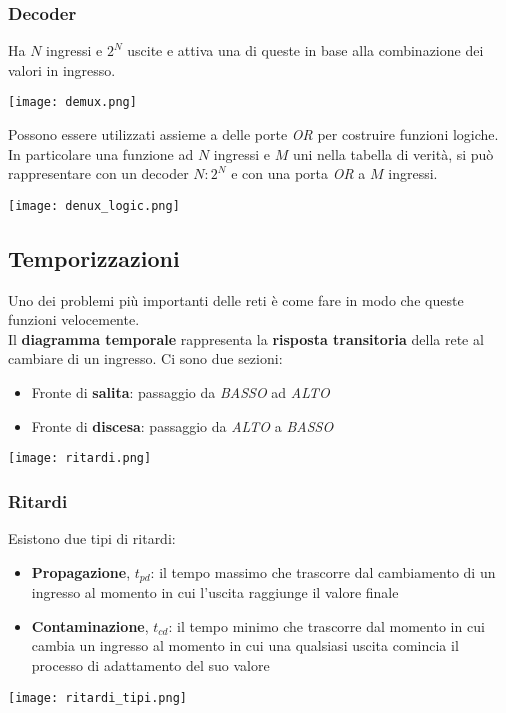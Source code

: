 \subsubsection{Decoder}
Ha $N$ ingressi e $2^N$ uscite e attiva una di queste in base alla combinazione dei valori in ingresso.
\begin{center}
	\texttt{[image: demux.png]}
\end{center}
Possono essere utilizzati assieme a delle porte \textit{OR} per costruire funzioni logiche. In particolare una funzione ad $N$ ingressi e $M$ uni nella tabella di verità, si può rappresentare con un decoder $N:2^N$ e con una porta \textit{OR} a $M$ ingressi.
\begin{center}
	\texttt{[image: denux\_logic.png]}
\end{center}

\subsection{Temporizzazioni}
Uno dei problemi più importanti delle reti è come fare in modo che queste funzioni velocemente.\\
Il \textbf{diagramma temporale} rappresenta la \textbf{risposta transitoria} della rete al cambiare di un ingresso. Ci sono due sezioni:
\begin{itemize}
	\item Fronte di \textbf{salita}: passaggio da \textit{BASSO} ad \textit{ALTO}
	\item Fronte di \textbf{discesa}: passaggio da \textit{ALTO} a \textit{BASSO}
\end{itemize}
\begin{center}
	\texttt{[image: ritardi.png]}
\end{center}
\subsubsection{Ritardi}
Esistono due tipi di ritardi:
\begin{itemize}
	\item \textbf{Propagazione}, $t_{pd}$: il tempo massimo che trascorre dal cambiamento di un ingresso al momento in cui l'uscita raggiunge il valore finale
	\item \textbf{Contaminazione}, $t_{cd}$: il tempo minimo che trascorre dal momento in cui cambia un ingresso al momento in cui una qualsiasi uscita comincia il processo di adattamento del suo valore
\end{itemize}
\begin{center}
	\texttt{[image: ritardi\_tipi.png]}
\end{center}

